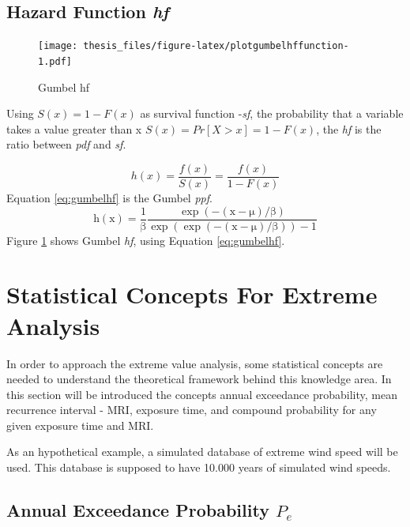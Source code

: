 \documentclass[12pt,oneside]{reedthesis}
\begin{document}
\hypertarget{hf}{%
\subsection{\texorpdfstring{Hazard Function \emph{hf}}{Hazard Function hf}}\label{hf}}

\footnotesize
\begin{figure}
\centering
\texttt{[image: thesis\_files/figure-latex/plotgumbelhffunction-1.pdf]}
\caption{\label{fig:plotgumbelhffunction}Gumbel hf}
\end{figure}
\normalsize

Using \(S(x) = 1 - F(x)\) as survival function -\emph{sf}, the probability that a variable takes a value greater than x \(S(x) = Pr[X > x] = 1 - F(x)\), the \emph{hf} is the ratio between \emph{pdf} and \emph{sf}.

\[
h(x) = \frac{f(x)}{S(x)} = \frac{f(x)}{1-F(x)}
\]
Equation \eqref{eq:gumbelhf} is the Gumbel \emph{ppf}.
\begin{equation}
\mathrm{
        h(x)= \frac{1}{\beta}\frac{\exp(-(x-\mu)/\beta)}{\exp(\exp(-(x-\mu)/\beta))-1}
       }
  \label{eq:gumbelhf}
\end{equation}
Figure \ref{fig:plotgumbelhffunction} shows Gumbel \emph{hf}, using Equation \eqref{eq:gumbelhf}.

\hypertarget{statistical-concepts-for-extreme-analysis}{%
\section{Statistical Concepts For Extreme Analysis}\label{statistical-concepts-for-extreme-analysis}}

In order to approach the extreme value analysis, some statistical concepts are needed to understand the theoretical framework behind this knowledge area. In this section will be introduced the concepts annual exceedance probability, mean recurrence interval - MRI, exposure time, and compound probability for any given exposure time and MRI.

As an hypothetical example, a simulated database of extreme wind speed will be used. This database is supposed to have 10.000 years of simulated wind speeds.

\hypertarget{annual-exceedance-probability-p_e}{%
\subsection{\texorpdfstring{Annual Exceedance Probability \(P_e\)}{Annual Exceedance Probability P\_e}}\label{annual-exceedance-probability-p_e}}
\end{document}
